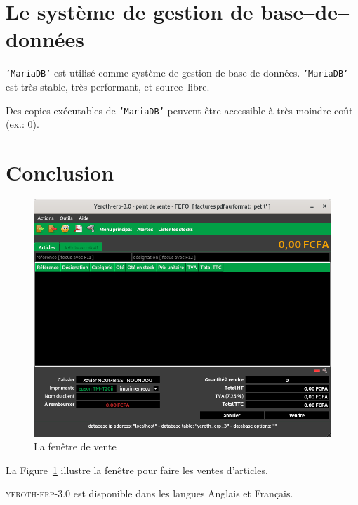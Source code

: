 \documentclass[a4paper, 10pt, twocolumn]{article}
\newcommand{\yeren}{\textsc{yeroth-erp-3.0}\xspace}
\newcommand{\mariadb}{\texttt{'MariaDB'}\xspace}
\begin{document}
\vspace{-1.1em}
\section{Le syst\`eme de gestion de base--de--donn\'ees}
\vspace{-0.3em}
\mariadb est utilis\'e comme syst\`eme de gestion
de base de donn\'ees. \mariadb est tr\`es stable,
tr\`es performant, et source--libre.

Des copies ex\'ecutables de \mariadb peuvent \^etre
accessible \`a tr\`es moindre co\^ut (ex.: $0$).

\vspace{-1.1em}
\section{Conclusion}
\vspace{-1em}
\begin{figure}[!htbp]
\centering
\includegraphics[scale=0.33]{../images/yeren-fenetre-caissier.png}
\caption{La fen\^etre de vente}
\label{fig:fenetre-de-vente}
\end{figure}

La Figure~\ref{fig:fenetre-de-vente} illustre la
fen\^etre pour faire les ventes d'articles.

\yeren est disponible dans les langues Anglais et Fran\c{c}ais. 
\end{document}
